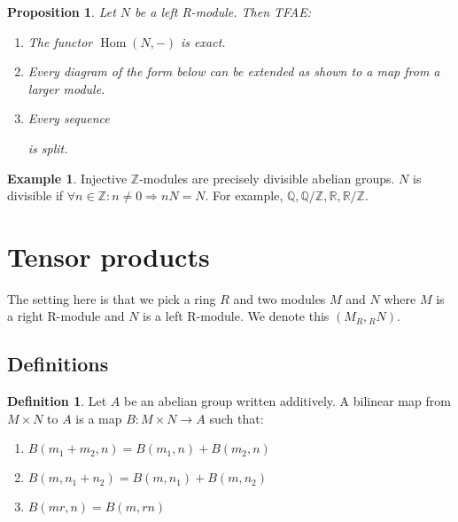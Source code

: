 \documentclass{article}
\newcommand\R{\ensuremath{\mathbb{R}}}
\newcommand\Z{\ensuremath{\mathbb{Z}}}
\newcommand\Q{\ensuremath{\mathbb{Q}}}
\DeclareMathOperator{\Hom}{Hom}
\theoremstyle{definition}
\newtheorem{definition}{Definition}[subsection]
\newtheorem{eg}{Example}[subsection]
\theoremstyle{remark}
\theoremstyle{plain}
\newtheorem{prop}{Proposition}[subsection]
\begin{document}
\begin{prop}
    Let \(N\) be a left R-module. Then TFAE: 
    \begin{enumerate}
        \item The functor \(\Hom(N, -)\) is exact.
        \item Every diagram of the form below can be extended as shown to a map from a larger module. \\

        \item Every sequence  is split. 
    \end{enumerate}
\end{prop}

\begin{eg}
    Injective \(\Z\)-modules are precisely divisible abelian groups. \(N\) is divisible 
    if \(\forall n \in \Z: n \neq 0 \Rightarrow nN = N\). For example, \(\Q, \Q/\Z, \R, \R/\Z\).
\end{eg}

\section{Tensor products}

The setting here is that we pick a ring \(R\) and two modules \(M\) and \(N\) where \(M\) is a right R-module and \(N\)
is a left R-module. We denote this \((M_R, {}_{R}N)\).

\subsection{Definitions}

\begin{definition}
    Let \(A\) be an abelian group written additively. A bilinear map from \(M\times N\) to \(A\) is a map \(B: M \times N \to A\) such that:
    \begin{enumerate}
        \item \(B(m_1 + m_2, n) = B(m_1, n) + B(m_2, n)\)
        \item \(B(m, n_1 + n_2) = B(m, n_1) + B(m, n_2)\)
        \item \(B(mr, n) = B(m, rn)\)
    \end{enumerate}
\end{definition}
\end{document}
